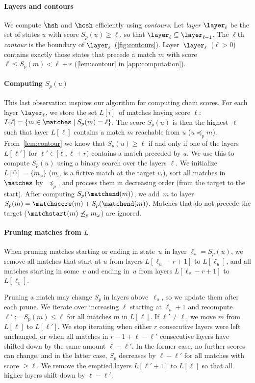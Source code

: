 \paragraph{Layers and contours}
We compute $\hsh$ and $\hcsh$ efficiently using \emph{contours}. Let
\emph{layer} $\layer_\ell$ be the set of states $u$ with score $S_p(u) \geq
\ell$, so that $\layer_\ell \subseteq \layer_{\ell{-}1}$. The $\ell$th
\emph{contour} is the boundary of $\layer_\ell$~(\cref{fig:contours}).
Layer~$\layer_\ell$~($\ell>0$) contains exactly those states that precede a
match $m$ with score $\ell \leq S_p(m) < \ell+r$ (\cref{lem:contour} in
\cref{app:computation}).

\paragraph{Computing $S_p(u)$}
This last observation inspires our algorithm for computing chain scores. For
each layer $\layer_\ell$, we store the set
$L[i]$~of matches having score $\ell$: ${L[\ell] = \{m\in \matches \mid S_p(m) =
\ell\}}$.
%
The score $S_p(u)$ is then the highest~$\ell$ such that
layer $L[\ell]$ contains a match $m$ reachable from $u$ ($u\preceq_p m$).
%
From~\cref{lem:contour} we know that $S_p(u) \geq \ell$ if and only if one of
the layers $L[\ell']$ for $\ell'\in [\ell, \ell+r)$ contains a match preceded
by $u$. We use this to compute $S_p(u)$ using a binary search over the layers $\ell$.
%
We initialize $L[0] {=} \{m_{\omega}\}$ ($m_{\omega}$ is a fictive match at the
target $v_t$), sort all matches in $\matches$ by~$\preceq_p$, and process them in
decreasing order (from the target to the start). After computing
$S_p(\matchend(m))$, we add~$m$ to layer $S_p(m) = \matchscore(m) +
S_p(\matchend(m))$. Matches that do not precede the target ($\matchstart(m) \not
\preceq_p m_\omega$) are ignored.

\paragraph{Pruning matches from $L$}
When pruning matches starting or ending in state~$u$ in layer $\ell_u=S_p(u)$,
we remove all matches that start at $u$ from layers $L[\ell_u{-}r{+}1]$ to
$L[\ell_u]$, and all matches starting in some~$v$ and ending in~$u$ from layers
$L[\ell_v{-}r{+}1]$ to $L[\ell_v]$.

Pruning a match may change $S_p$ in layers above~$\ell_u$, so we update them
after each prune. We iterate over increasing $\ell$ starting at
$\ell_u+1$ and recompute ${\ell':=S_p(m)\leq \ell}$ for all matches $m$ in
$L[\ell]$. If $\ell' \neq \ell$, we move $m$ from $L[\ell]$ to $L[\ell']$. We
stop iterating when either $r$ consecutive layers were left
unchanged, or when all matches in $r-1+\ell-\ell'$ consecutive layers have
shifted down by the same amount $\ell-\ell'$. In the former case, no further
scores can change, and in the latter case, $S_p$ decreases by $\ell-\ell'$
for all matches with score $\geq \ell$. We remove the emptied layers
${L[\ell'+1]}$ to $L[\ell]$ so that all higher layers shift down by
$\ell-\ell'$.

